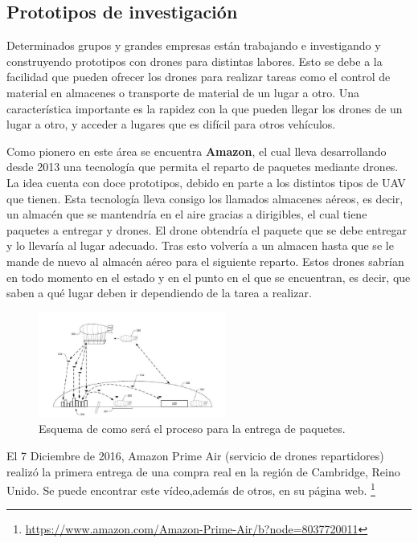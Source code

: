 
\subsection{Prototipos de investigaci\'on }
\hspace{1 cm} Determinados grupos y grandes empresas est\'an trabajando e investigando y construyendo prototipos con drones para distintas labores. Esto se debe a la facilidad que pueden ofrecer los drones para realizar tareas como el control de material en almacenes o transporte de material de un lugar a otro. Una caracter\'istica importante es la rapidez con la que pueden llegar los drones de un lugar a otro, y acceder a lugares que es dif\'icil para otros veh\'iculos. 


\hspace{1 cm} Como pionero en este \'area se encuentra \textbf{Amazon}, el cual lleva desarrollando desde 2013 una tecnolog\'ia que permita el reparto de paquetes mediante drones. La idea cuenta con doce prototipos, debido en parte a los distintos tipos de UAV que tienen.  Esta tecnolog\'ia lleva consigo los llamados almacenes a\'ereos, es decir, un almac\'en que se mantendr\'ia en el aire gracias a dirigibles, el cual tiene paquetes a entregar y drones. El drone obtendr\'ia el paquete que se debe entregar y lo llevar\'ia al lugar adecuado. Tras esto volver\'ia a un almacen hasta que se le mande de nuevo al almac\'en a\'ereo para el siguiente reparto. Estos drones sabr\'ian en todo momento en el estado y en el punto en el que se encuentran, es decir, que saben a qu\'e lugar deben ir dependiendo de la tarea a realizar. 

\begin{figure}[ht]
	\centering
		\includegraphics[width=0.55\textwidth]{imgs/amazon.jpg}
                \caption{Esquema de como ser\'a el proceso para la entrega de paquetes.}
	\label{fig:Esquema de reparto con drones}
\end{figure}

\hspace{1 cm} El 7 Diciembre de 2016, Amazon Prime Air (servicio de drones repartidores) realiz\'o la primera entrega de una compra real en la regi\'on de Cambridge, Reino Unido. Se puede encontrar este v\'ideo,adem\'as de otros, en su p\'agina web. \footnote{\url{https://www.amazon.com/Amazon-Prime-Air/b?node=8037720011}}

